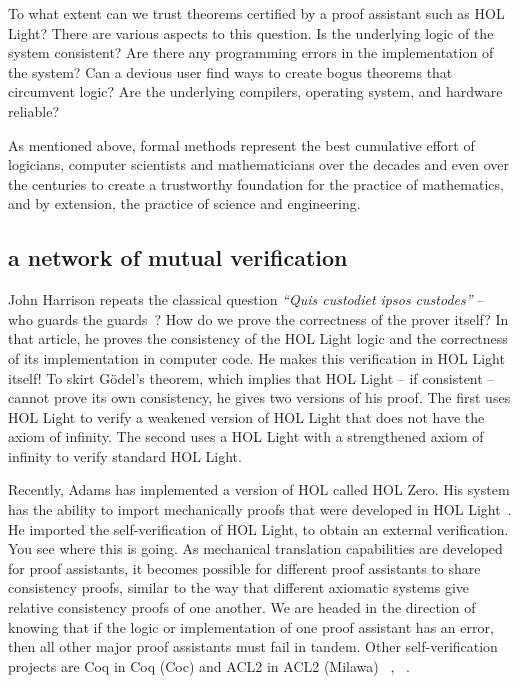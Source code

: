 \documentclass{llncs}
\begin{document}
To what extent can we trust theorems certified by a proof assistant
such as HOL Light?  There are  various aspects to this question.
Is the underlying logic of the system consistent?  Are there any
programming errors in the implementation of the system?  Can a devious
user find ways to create bogus theorems that circumvent logic?  Are
the underlying compilers, operating system, and hardware reliable?

As mentioned above, formal methods represent the best cumulative effort of
logicians, computer scientists and mathematicians over the decades and
even over the centuries to create a trustworthy foundation for the
practice of mathematics, and by extension, the practice of science and
engineering.  

\subsection{a network of mutual verification}

John Harrison repeats the classical question {\it ``Quis custodiet
  ipsos custodes''} -- who guards the guards~\cite{HaSelf}?  How do we
prove the correctness of the prover itself?  In that article, he proves
the consistency of the HOL Light logic and the correctness of its
implementation in computer code.  He makes this verification in HOL
Light itself!  To skirt G\"odel's theorem, which implies that HOL
Light -- if consistent -- cannot prove its own consistency, he gives
two versions of his proof.  The first uses HOL Light to verify a
weakened version of HOL Light that does not have the axiom of
infinity.  The second uses a HOL Light with a strengthened axiom of
infinity to verify standard HOL Light.


Recently, Adams has implemented a version of HOL called HOL Zero.  His
system has the ability to import mechanically proofs that were
developed in HOL Light~\cite{Adams}.  He imported the
self-verification of HOL Light, to obtain an external verification.
You see where this is going.  As mechanical translation capabilities
are developed for proof assistants, it becomes possible for different
proof assistants to share consistency proofs, similar to the way that
different axiomatic systems give relative consistency proofs of one
another.  We are headed in the direction of knowing that if the logic
or implementation of one proof assistant has an error, then all other
major proof assistants must fail in tandem. Other self-verification
projects are Coq in Coq (Coc) and ACL2 in ACL2 (Milawa) ~\cite{Bar98},
~\cite{Dav09}.
\end{document}
